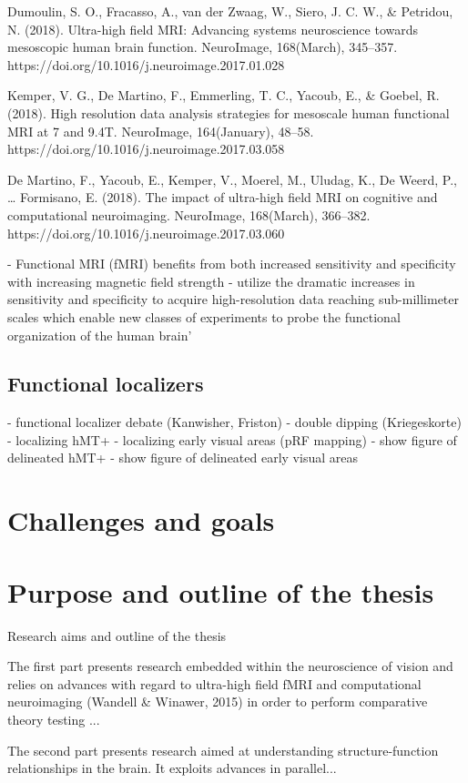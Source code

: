 Dumoulin, S. O., Fracasso, A., van der Zwaag, W., Siero, J. C. W., & Petridou, N. (2018). Ultra-high field MRI: Advancing systems neuroscience towards mesoscopic human brain function. NeuroImage, 168(March), 345–357. https://doi.org/10.1016/j.neuroimage.2017.01.028

Kemper, V. G., De Martino, F., Emmerling, T. C., Yacoub, E., & Goebel, R. (2018). High resolution data analysis strategies for mesoscale human functional MRI at 7 and 9.4T. NeuroImage, 164(January), 48–58. https://doi.org/10.1016/j.neuroimage.2017.03.058

De Martino, F., Yacoub, E., Kemper, V., Moerel, M., Uludag, K., De Weerd, P., … Formisano, E. (2018). The impact of ultra-high field MRI on cognitive and computational neuroimaging. NeuroImage, 168(March), 366–382. https://doi.org/10.1016/j.neuroimage.2017.03.060


- Functional MRI (fMRI) benefits from both increased sensitivity and specificity with increasing magnetic field strength
- utilize the dramatic increases in sensitivity and specificity to acquire high-resolution data reaching sub-millimeter scales
which enable new classes of experiments to probe the functional organization of the human brain'





\subsection{Functional localizers}
- functional localizer debate (Kanwisher, Friston)
- double dipping (Kriegeskorte)
- localizing hMT+
- localizing early visual areas (pRF mapping)
- show figure of delineated hMT+
- show figure of delineated early visual areas





\section{Challenges and goals}
\lipsum[2-5]

\section{Purpose and outline of the thesis}

Research aims and outline of the thesis

The first part presents research embedded within the neuroscience of vision and relies on advances with regard to ultra-high field fMRI and computational neuroimaging (Wandell & Winawer, 2015) in order to perform comparative theory testing ...

The second part presents research aimed at understanding structure-function relationships in the brain. It exploits advances in parallel...